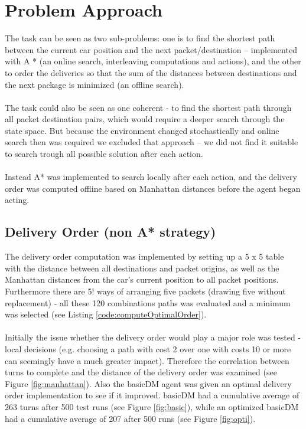 \documentclass[a4paper]{article}
\begin{document}
\section{Problem Approach} 
The task can be seen as two sub-problems: one is to find the shortest path between the current car position and the next packet/destination – implemented with A * (an online search, interleaving computations and actions), and the other to order the deliveries so that the sum of the distances between destinations and the next package is minimized (an offline search).\\
\\
The task could also be seen as one coherent - to find the shortest path through all packet destination pairs, which would require a deeper search through the state space. But because the environment changed stochastically and online search then was required we excluded that approach – we did not find it suitable to search trough all possible solution after each action.\\
\\
Instead A* was implemented to search locally after each action, and the delivery order was computed offline based on Manhattan distances before the agent began acting.

\subsection{Delivery Order (non A* strategy)}
The delivery order computation was implemented by setting up a 5 x 5 table with the distance between all destinations and packet origins, as well as the Manhattan distances from the car's current position to all packet positions. Furthermore there are 5! ways of arranging five packets (drawing five without replacement) - all these 120 combinations paths was evaluated and a minimum was selected (see Listing \ref{code:computeOptimalOrder}).\\
\\
Initially the issue whether the delivery order would play a major role was tested - local decisions (e.g. choosing a path with cost 2 over one with costs 10 or more can seemingly have a much greater impact). Therefore the correlation between turns to complete and the distance of the delivery order was examined (see Figure \ref{fig:manhattan}). Also the basicDM agent was given an optimal delivery order implementation to see if it improved. basicDM had a cumulative average of 263 turns after 500 test runs (see Figure \ref{fig:basic}), while an optimized basicDM had a cumulative average of 207 after 500 runs (see Figure \ref{fig:opti}).
\end{document}

